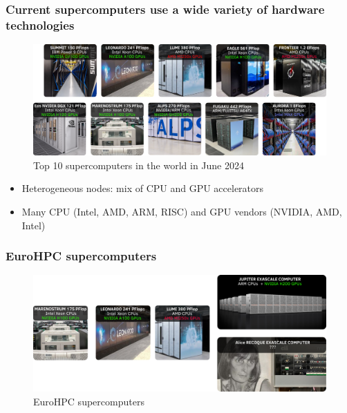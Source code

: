 \documentclass[aspectratio=169]{beamer}
\begin{document}
\begin{frame}
\frametitle{Current supercomputers use a wide variety of hardware technologies}

\begin{figure}
\begin{center}
    \includegraphics[width=1\textwidth]{../../images/top10_super_computers.png}
    \caption{Top 10 supercomputers in the world in June 2024}
\end{center}
\end{figure}

\begin{itemize}
\item Heterogeneous nodes: mix of CPU and GPU accelerators
\item Many CPU (Intel, AMD, ARM, RISC) and GPU vendors (NVIDIA, AMD, Intel)
\end{itemize}

\end{frame}


\begin{frame}
\frametitle{EuroHPC supercomputers}

\begin{figure}
\begin{center}
    \includegraphics[width=1\textwidth]{../../images/euroHPC.png}
    \caption{EuroHPC supercomputers}
\end{center}
\end{figure}

\end{frame}
\end{document}

